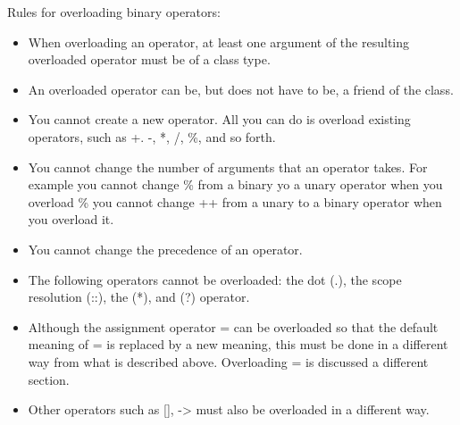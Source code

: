 
\noindent
Rules for overloading binary operators:
\begin{itemize}
	\item When overloading an operator, at least one argument of the resulting overloaded
	operator must be of a class type.
	\item An overloaded operator can be, but does not have to be, a friend of the class.
	\item You cannot create a new operator. All you can do is overload existing operators, such
	as +. -, *, /, \%, and so forth.
	\item You cannot change the number of arguments that an operator takes. For example you
	cannot change \% from a binary yo a unary operator when you overload \% you cannot change
	++ from a unary to a binary operator when you overload it.
	\item You cannot change the precedence of an operator.
	\item The following operators cannot be overloaded: the dot (.), the scope resolution (::), the 
	(*), and (?) operator.
	\item Although the assignment operator = can be overloaded so that the default meaning
	of = is replaced by a new meaning, this must be done in a different way from what is described
	above. Overloading = is discussed a different section.
	\item Other operators such as [], -> must also be overloaded in a different way.
\end{itemize}



